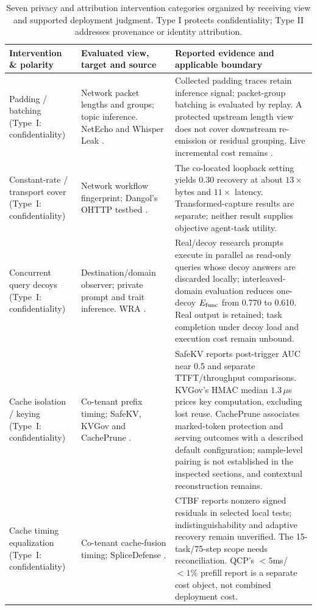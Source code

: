 \begin{table}[t]\centering\footnotesize
\caption{Seven privacy and attribution intervention categories organized by receiving view and supported deployment judgment. Type I protects confidentiality; Type II addresses provenance or identity attribution.}\label{tab:defense-types}
\begin{tabularx}{\textwidth}{@{}p{}p{}Y@{}}\toprule
Intervention \& polarity & Evaluated view, target and source & Reported evidence and applicable boundary\\\midrule
Padding / batching (Type~I: confidentiality) & Network packet lengths and groups; topic inference. NetEcho and Whisper Leak \cite{netecho2025,whisperleak2025}. & Collected padding traces retain inference signal; packet-group batching is evaluated by replay. A protected upstream length view does not cover downstream re-emission or residual grouping. Live incremental cost remains \NRR{}.\\
Constant-rate / transport cover (Type~I: confidentiality) & Network workflow fingerprint; Dangol's OHTTP testbed \cite{dangol2026workflow}. & The co-located loopback setting yields 0.30 recovery at about $13\times$ bytes and $11\times$ latency. Transformed-capture results are separate; neither result supplies objective agent-task utility.\\
Concurrent query decoys (Type~I: confidentiality) & Destination/domain observer; private prompt and trait inference. WRA \cite{jeong2026wra}. & Real/decoy research prompts execute in parallel as read-only queries whose decoy answers are discarded locally; interleaved-domain evaluation reduces one-decoy $E_{\rm func}$ from 0.770 to 0.610. Real output is retained; task completion under decoy load and execution cost remain unbound.\\
Cache isolation / keying (Type~I: confidentiality) & Co-tenant prefix timing; SafeKV, KVGov and CachePrune \cite{chu2025safekv,addagada2026kvgov,wu2026cacheprune}. & SafeKV reports post-trigger AUC near 0.5 and separate TTFT/throughput comparisons. KVGov's HMAC median $1.3\,\mu$s prices key computation, excluding lost reuse. CachePrune associates marked-token protection and serving outcomes with a described default configuration; sample-level pairing is not established in the inspected sections, and contextual reconstruction remains.\\
Cache timing equalization (Type~I: confidentiality) & Co-tenant cache-fusion timing; SpliceDefense \cite{spliceleak2026}. & CTBF reports nonzero signed residuals in selected local tests; indistinguishability and adaptive recovery remain unverified. The 15-task/75-step scope needs reconciliation. QCP's $<5$ms/$<1\%$ prefill report is a separate cost object, not combined deployment cost.\\

\end{tabularx}
\end{table}
